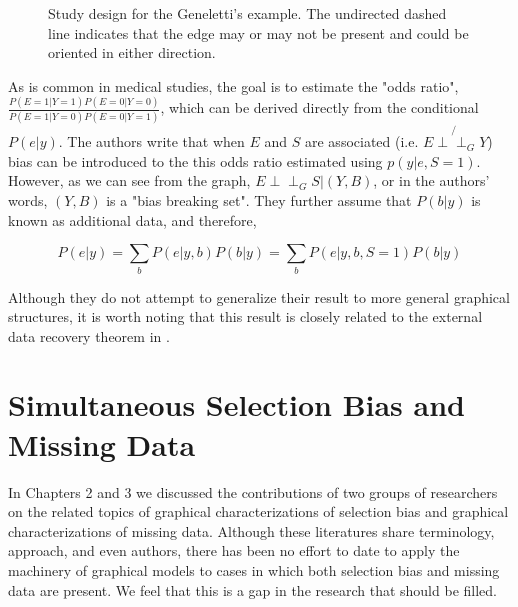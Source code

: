 \documentclass[12pt,twoside]{reedthesis}
\theoremstyle{definition}
\newcommand{\dsep}{\perp \!\!\!\perp}
\begin{document}
\begin{figure}[H]
\begin{center}
\end{center}
\caption{Study design for the Geneletti's example. The undirected dashed line indicates that the edge may or may not be present and could be oriented in either direction.}
\end{figure}

As is common in medical studies, the goal is to estimate the "odds ratio", $\frac{P(E = 1 | Y =1)P(E = 0 | Y = 0)}{P(E = 1 | Y = 0)P(E = 0 | Y = 1)}$, which can be derived directly from the conditional $P(e | y)$.  The authors write that when $E$ and $S$ are associated (i.e. $E \not{\dsep_G} Y$) bias can be introduced to the this odds ratio estimated using $p(y | e, S = 1)$. However, as we can see from the graph, $E \dsep_G S | (Y,B)$, or in the authors' words, $(Y,B)$ is a "bias breaking set". They further assume that $P(b | y)$ is known as additional data, and therefore, 

$$P(e | y) = \sum_b P(e | y, b)P(b | y) =  \sum_b P(e | y, b, S = 1)P(b | y)$$

Although they do not attempt to generalize their result to more general graphical structures, it is worth noting that this result is closely related to the external data recovery theorem in \citep{Bareinboim_2014}. 
\chapter{Simultaneous Selection Bias and Missing Data}
In Chapters 2 and 3 we discussed the contributions of two groups of researchers on the related topics of graphical characterizations of selection bias and  graphical characterizations of missing data. Although these literatures share terminology, approach, and even authors, there has been no effort to date to apply the machinery of graphical models to cases in which both selection bias and missing data are present. We feel that this is a gap in the research that should be filled. 
\end{document}

